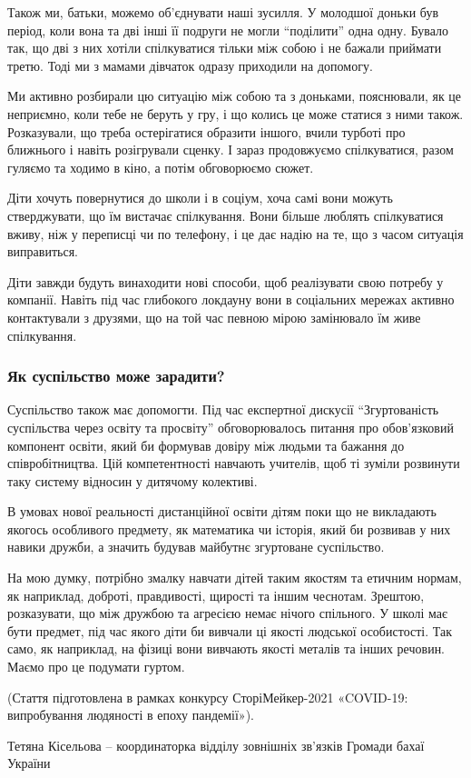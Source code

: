 Також ми, батьки, можемо об’єднувати наші зусилля. У молодшої доньки був
період, коли вона та дві інші її подруги не могли “поділити” одна одну. Бувало
так, що дві з них хотіли спілкуватися тільки між собою і не бажали приймати
третю. Тоді ми з мамами дівчаток одразу приходили на допомогу.

Ми активно розбирали цю ситуацію між собою та з доньками, пояснювали, як це
неприємно, коли тебе не беруть у гру, і що колись це може статися з ними також.
Розказували, що треба остерігатися образити іншого, вчили турботі про ближнього
і навіть розігрували сценку. І зараз продовжуємо спілкуватися, разом гуляємо та
ходимо в кіно, а потім обговорюємо сюжет.

Діти хочуть повернутися до школи і в соціум, хоча самі вони можуть
стверджувати, що їм вистачає спілкування. Вони більше люблять спілкуватися
вживу, ніж у переписці чи по телефону, і це дає надію на те, що з часом
ситуація виправиться.

Діти завжди будуть винаходити нові способи, щоб реалізувати свою потребу у
компанії. Навіть під час глибокого локдауну вони в соціальних мережах активно
контактували з друзями, що на той час певною мірою замінювало їм живе
спілкування.

\subsubsection{Як суспільство може зарадити?}

Суспільство також має допомогти. Під час експертної дискусії \enquote{Згуртованість
суспільства через освіту та просвіту} обговорювалось питання про обов’язковий
компонент освіти, який би формував довіру між людьми та бажання до
співробітництва. Цій компетентності навчають учителів, щоб ті зуміли розвинути
таку систему відносин у дитячому колективі.

В умовах нової реальності дистанційної освіти дітям поки що не викладають
якогось особливого предмету, як математика чи історія, який би розвивав у них
навики дружби, а значить будував майбутнє згуртоване суспільство.

На мою думку, потрібно змалку навчати дітей таким якостям та етичним нормам, як
наприклад, доброті, правдивості, щирості та іншим чеснотам. Зрештою,
розказувати, що між дружбою та агресією немає нічого спільного. У школі має
бути предмет, під час якого діти би вивчали ці якості людської особистості. Так
само, як наприклад, на фізиці вони вивчають якості металів та інших речовин.
Маємо про це подумати гуртом.

(Стаття підготовлена в рамках конкурсу СторіМейкер-2021 «COVID-19: випробування
людяності в епоху пандемії»).

Тетяна Кісельова – координаторка відділу зовнішніх зв'язків Громади бахаї
України
